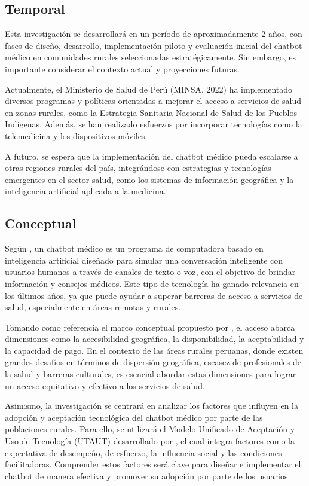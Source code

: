 \subsection{Temporal}
Esta investigación se desarrollará en un período de aproximadamente 2 años, con fases de diseño, desarrollo, implementación piloto y evaluación inicial del chatbot médico en comunidades rurales seleccionadas estratégicamente. Sin embargo, es importante considerar el contexto actual y proyecciones futuras.

Actualmente, el Ministerio de Salud de Perú (MINSA, 2022) ha implementado diversos programas y políticas orientadas a mejorar el acceso a servicios de salud en zonas rurales, como la Estrategia Sanitaria Nacional de Salud de los Pueblos Indígenas. Además, se han realizado esfuerzos por incorporar tecnologías como la telemedicina y los dispositivos móviles.

A futuro, se espera que la implementación del chatbot médico pueda escalarse a otras regiones rurales del país, integrándose con estrategias y tecnologías emergentes en el sector salud, como los sistemas de información geográfica y la inteligencia artificial aplicada a la medicina.

\subsection{Conceptual}
Según \cite{pr_Laranjo2018-gb}, un chatbot médico es un programa de computadora basado en inteligencia artificial diseñado para simular una conversación inteligente con usuarios humanos a través de canales de texto o voz, con el objetivo de brindar información y consejos médicos. Este tipo de tecnología ha ganado relevancia en los últimos años, ya que puede ayudar a superar barreras de acceso a servicios de salud, especialmente en áreas remotas y rurales.

Tomando como referencia el marco conceptual propuesto por \cite{pr_Levesque2013-vb}, el acceso abarca dimensiones como la accesibilidad geográfica, la disponibilidad, la aceptabilidad y la capacidad de pago. En el contexto de las áreas rurales peruanas, donde existen grandes desafíos en términos de dispersión geográfica, escasez de profesionales de la salud y barreras culturales, es esencial abordar estas dimensiones para lograr un acceso equitativo y efectivo a los servicios de salud.

Asimismo, la investigación se centrará en analizar los factores que influyen en la adopción y aceptación tecnológica del chatbot médico por parte de las poblaciones rurales. Para ello, se utilizará el Modelo Unificado de Aceptación y Uso de Tecnología (UTAUT) desarrollado por \cite{pr_Venkatesh2003-po}, el cual integra factores como la expectativa de desempeño, de esfuerzo, la influencia social y las condiciones facilitadoras. Comprender estos factores será clave para diseñar e implementar el chatbot de manera efectiva y promover su adopción por parte de los usuarios.

